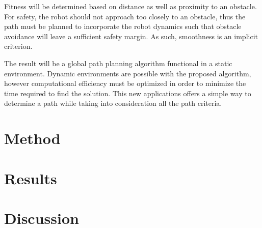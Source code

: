 \documentclass[twoside]{article}
\begin{document}
\begin{multicols}{2}
Fitness will be determined based on distance as well as proximity to an obstacle. For safety, the robot should not approach too closely to an obstacle, thus the path must be planned to incorporate the robot dynamics such that obstacle avoidance will leave a sufficient safety margin. As such, smoothness is an implicit criterion.

The result will be a global path planning algorithm functional in a static environment. Dynamic environments are possible with the proposed algorithm, however computational efficiency must be optimized in order to minimize the time required to find the solution. This new applications offers a simple way to determine a path while taking into consideration all the path criteria.

\section{Method}
\lipsum[1-5] %

\section{Results}
\lipsum[1-5] %

\section{Discussion}

\lipsum[1-5]


%



%
% 


\end{multicols}
\end{document}

